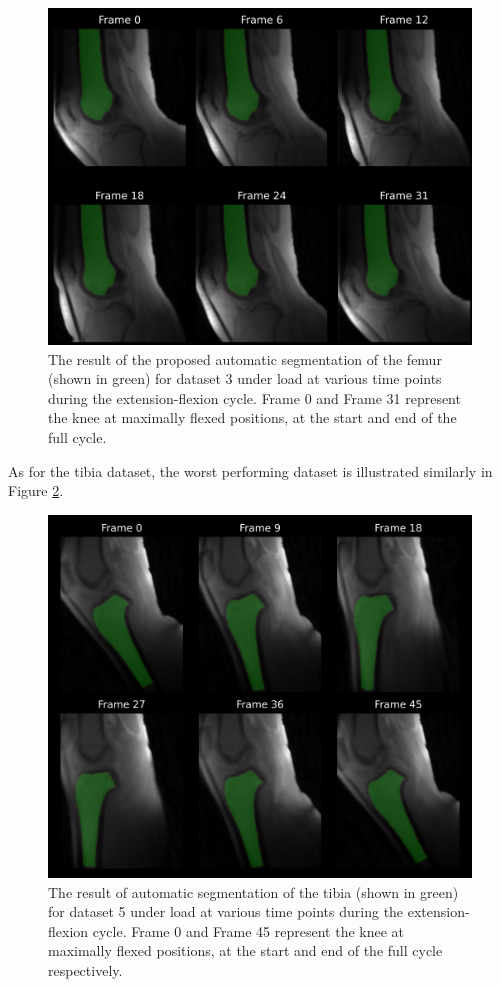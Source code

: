 \documentclass{micro-econ-thesis}
\begin{document}
\begin{figure}[H]
	\centering
	\includegraphics[width=0.7\linewidth]{d5_W_fem}
	\caption{ The result of the proposed automatic segmentation of the femur (shown in green) for dataset 3 under load at various time points during the extension-flexion cycle. Frame 0 and Frame 31 represent the knee at maximally flexed positions, at the start and end of the full cycle.}
	\label{fig:d5wfem}
\end{figure}

As for the tibia dataset, the worst performing dataset is illustrated similarly in Figure \ref{fig:d7wtib}. 

\begin{figure} [H]
	\centering
	\includegraphics[width=0.7\linewidth]{d7_W_tib}
	\caption{ The result of automatic segmentation of the tibia (shown in green) for dataset 5 under load at various time points during the extension-flexion cycle. Frame 0 and Frame 45 represent the knee at maximally flexed positions, at the start and end of the full cycle respectively.}
	\label{fig:d7wtib}
\end{figure}
 
\end{document}
